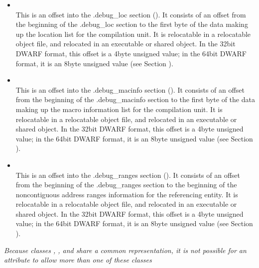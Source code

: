 \begin{itemize}
\item {} \\
This is an offset into the .debug\_loc section
(). It consists of an offset from the
beginning of the .debug\_loc section to the first byte of
the data making up the location list for the compilation
unit. 
It is relocatable in a relocatable object file, and
relocated in an executable or shared object. In the 32\dash bit
DWARF format, this offset is a 4\dash byte unsigned value;
in the 64\dash bit DWARF format, it is an 8\dash byte unsigned value
(see Section ).


\item {} \\
This is an offset into the .debug\_macinfo section
(). It consists of an offset from the
beginning of the .debug\_macinfo section to the first byte of
the data making up the macro information list for the compilation
unit. 
It is relocatable in a relocatable object file, and
relocated in an executable or shared object. In the 32\dash bit
DWARF format, this offset is a 4\dash byte unsigned value;
in the 64\dash bit DWARF format, it is an 8\dash byte unsigned value
(see Section ).

\item {} \\
This is an offset into the .debug\_ranges section
(). 
It consists of an
offset from the beginning of the .debug\_ranges section
to the beginning of the non\dash contiguous address ranges
information for the referencing entity.  
It is relocatable in
a relocatable object file, and relocated in an executable or
shared object. In the 32\dash bit DWARF format, this offset
is a 4\dash byte unsigned value; in the 64\dash bit DWARF
format, it is an 8\dash byte unsigned value (see Section
).
\end{itemize}

\textit{Because classes , ,  and 
share a common representation, it is not possible for an
attribute to allow more than one of these classes}


